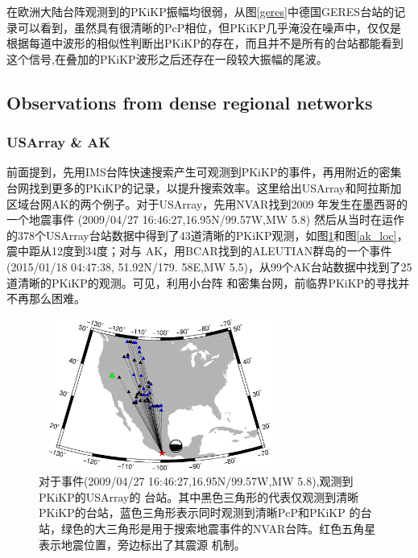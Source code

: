 在欧洲大陆台阵观测到的PKiKP振幅均很弱，从图\ref{geres}中德国GERES台站的记录可以看到，虽然具有很清晰的PcP相位，但PKiKP几乎淹没在噪声中，仅仅是根据每道中波形的相似性判断出PKiKP的存在，而且并不是所有的台站都能看到这个信号,在叠加的PKiKP波形之后还存在一段较大振幅的尾波。

\newpage

\subsection{Observations from dense regional networks}

\subsubsection{USArray \& AK}

前面提到，先用IMS台阵快速搜索产生可观测到PKiKP的事件，再用附近的密集台网找到更多的PKiKP的记录，以提升搜索效率。这里给出USArray和阿拉斯加区域台网AK的两个例子。对于USArray，先用NVAR找到2009
年发生在墨西哥的一个地震事件
(2009/04/27 16:46:27,16.95{\textdegree}N/99.57{\textdegree}W,MW 5.8)
然后从当时在运作的378个USArray台站数据中得到了43道清晰的PKiKP观测，如图\ref{usarray_loc}和图\ref{ak_loc}，震中距从12度到34度；对与
AK，用BCAR找到的ALEUTIAN群岛的一个事件(2015/01/18 04:47:38, 51.92{\textdegree}N/179.
58{\textdegree}E,MW 5.5)，从99个AK台站数据中找到了25道清晰的PKiKP的观测。可见，利用小台阵
和密集台网，前临界PKiKP的寻找并不再那么困难。 

\begin{figure}[!ht]
	\centering
	\includegraphics[width=8cm,height=5cm]{fig/chap3/usarray_loc.eps}
	\caption{对于事件(2009/04/27 %
16:46:27,16.95{\textdegree}N/99.57{\textdegree}W,MW 5.8),观测到PKiKP的USArray的%
台站。其中黑色三角形的代表仅观测到清晰PKiKP的台站，蓝色三角形表示同时观测到清晰PcP和PKiKP%
的台站，绿色的大三角形是用于搜索地震事件的NVAR台阵。红色五角星表示地震位置，旁边标出了其震源%
机制。}
	\label{usarray_loc}
\end{figure}

